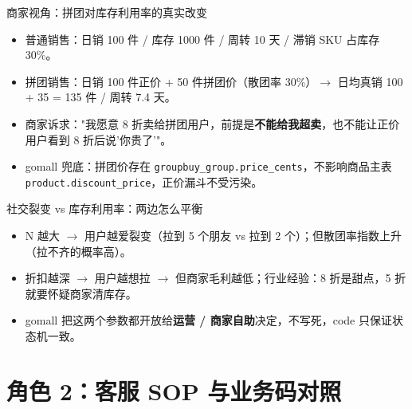 \documentclass[aspectratio=169,11pt]{beamer}
\begin{document}
\begin{frame}[shrink]{商家视角：拼团对库存利用率的真实改变}
\begin{itemize}
  \item 普通销售：日销 100 件 / 库存 1000 件 / 周转 10 天 / 滞销 SKU 占库存 30\%。
  \item 拼团销售：日销 100 件正价 + 50 件拼团价（散团率 30\%）$\to$ 日均真销 100 + 35 = 135 件 / 周转 7.4 天。
  \item 商家诉求："我愿意 8 折卖给拼团用户，前提是\textbf{不能给我超卖}，也不能让正价用户看到 8 折后说'你贵了'"。
  \item gomall 兜底：拼团价存在 \texttt{groupbuy\_group.price\_cents}，不影响商品主表 \texttt{product.discount\_price}，正价漏斗不受污染。
\end{itemize}
\end{frame}

\begin{frame}[shrink]{社交裂变 vs 库存利用率：两边怎么平衡}
\vspace{2mm}
\begin{itemize}
  \item N 越大 $\to$ 用户越爱裂变（拉到 5 个朋友 vs 拉到 2 个）；但散团率指数上升（拉不齐的概率高）。
  \item 折扣越深 $\to$ 用户越想拉 $\to$ 但商家毛利越低；行业经验：8 折是甜点，5 折就要怀疑商家清库存。
  \item gomall 把这两个参数都开放给\textbf{运营 / 商家自助}决定，不写死，code 只保证状态机一致。
\end{itemize}
\end{frame}

\section{角色 2：客服 SOP 与业务码对照}
\end{document}
